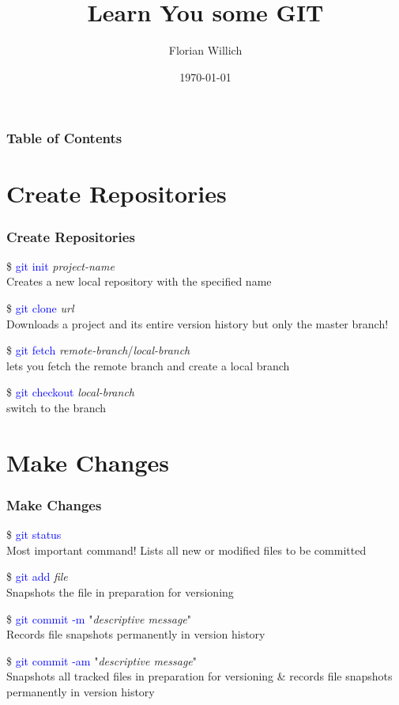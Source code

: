 \documentclass[aspectratio=169]{beamer}
\title[Learn You some GIT] %
{Learn You some GIT}
\author[Florian Willich]{Florian Willich}
\institute[BIT]
{
  Quality and Usability Lab\\
  Berlin Institute of Technology
}
\date{\today}
\begin{document}
\frame{\titlepage}

\begin{frame}
\frametitle{Table of Contents}
\tableofcontents[currentsection]
\end{frame}

\section{Create Repositories}
\begin{frame}

\frametitle{Create Repositories}

\$ \textcolor{blue}{git init} \textit{project-name}\\
Creates a new local repository with the specified name

\$ \textcolor{blue}{git clone} \textit{url}\\
Downloads a project and its entire version history but only the master branch!

\$ \textcolor{blue}{git fetch} \textit{remote-branch}/\textit{local-branch}\\
lets you fetch the remote branch and create a local branch

\$ \textcolor{blue}{git checkout} \textit{local-branch}\\
switch to the branch\\

\end{frame}

\section{Make Changes}
\begin{frame}
  
\frametitle{Make Changes}

\$ \textcolor{blue}{git status}\\
Most important command! Lists all new or modified files to be committed

\$ \textcolor{blue}{git add} \textit{file}\\
Snapshots the file in preparation for versioning

\$ \textcolor{blue}{git commit -m} "\textit{descriptive message}"\\
Records file snapshots permanently in version history

\$ \textcolor{blue}{git commit -am} "\textit{descriptive message}"\\
Snapshots all tracked files in preparation for versioning \& records file snapshots permanently in version history

\end{frame}
\end{document}
